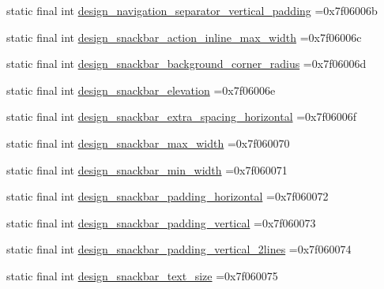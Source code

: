\begin{DoxyCompactItemize}
\item 
static final int \mbox{\hyperlink{classbr_1_1unb_1_1cic_1_1mp_1_1marketmaster_1_1R_1_1dimen_a027807a41521cd2d87901a466cee7b5e}{design\+\_\+navigation\+\_\+separator\+\_\+vertical\+\_\+padding}} =0x7f06006b
\item 
static final int \mbox{\hyperlink{classbr_1_1unb_1_1cic_1_1mp_1_1marketmaster_1_1R_1_1dimen_af78d784624dafd7ededf692cdb56fb4e}{design\+\_\+snackbar\+\_\+action\+\_\+inline\+\_\+max\+\_\+width}} =0x7f06006c
\item 
static final int \mbox{\hyperlink{classbr_1_1unb_1_1cic_1_1mp_1_1marketmaster_1_1R_1_1dimen_a7729ff47e424eb43839b1f17970f57ab}{design\+\_\+snackbar\+\_\+background\+\_\+corner\+\_\+radius}} =0x7f06006d
\item 
static final int \mbox{\hyperlink{classbr_1_1unb_1_1cic_1_1mp_1_1marketmaster_1_1R_1_1dimen_a08738403497d203934f618ebc6c400ed}{design\+\_\+snackbar\+\_\+elevation}} =0x7f06006e
\item 
static final int \mbox{\hyperlink{classbr_1_1unb_1_1cic_1_1mp_1_1marketmaster_1_1R_1_1dimen_aa2c34af591a19da7a64b016d6ec6c3a6}{design\+\_\+snackbar\+\_\+extra\+\_\+spacing\+\_\+horizontal}} =0x7f06006f
\item 
static final int \mbox{\hyperlink{classbr_1_1unb_1_1cic_1_1mp_1_1marketmaster_1_1R_1_1dimen_aa1428e89b73403c8cf6a223132d084f6}{design\+\_\+snackbar\+\_\+max\+\_\+width}} =0x7f060070
\item 
static final int \mbox{\hyperlink{classbr_1_1unb_1_1cic_1_1mp_1_1marketmaster_1_1R_1_1dimen_a6d19cbfe5eaf9883bb64eda67cc6b79b}{design\+\_\+snackbar\+\_\+min\+\_\+width}} =0x7f060071
\item 
static final int \mbox{\hyperlink{classbr_1_1unb_1_1cic_1_1mp_1_1marketmaster_1_1R_1_1dimen_a43510a1b3d8465a72cd04804c9212c9a}{design\+\_\+snackbar\+\_\+padding\+\_\+horizontal}} =0x7f060072
\item 
static final int \mbox{\hyperlink{classbr_1_1unb_1_1cic_1_1mp_1_1marketmaster_1_1R_1_1dimen_a46709d21f9426e0a7a489c3a82d1c605}{design\+\_\+snackbar\+\_\+padding\+\_\+vertical}} =0x7f060073
\item 
static final int \mbox{\hyperlink{classbr_1_1unb_1_1cic_1_1mp_1_1marketmaster_1_1R_1_1dimen_a29baad0db262a6aeb5f8726d1dac2163}{design\+\_\+snackbar\+\_\+padding\+\_\+vertical\+\_\+2lines}} =0x7f060074
\item 
static final int \mbox{\hyperlink{classbr_1_1unb_1_1cic_1_1mp_1_1marketmaster_1_1R_1_1dimen_a73eb9edb620666b91dff0dd8cc3a6a0a}{design\+\_\+snackbar\+\_\+text\+\_\+size}} =0x7f060075

\end{DoxyCompactItemize}
